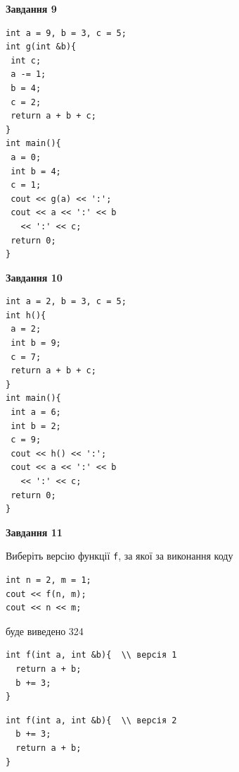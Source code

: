 \documentclass[12pt, ukrainian]{article}
\def\code#1{\Verb!#1!}
\begin{document}
{\begin {large}
\begin{minipage}[t]{11.0cm}
\end{minipage}


\begin{minipage}[t]{7.0cm}

\begin{center}
\textbf{Завдання 9}
\end{center}
\vspace{-8mm}

\begin{verbatim}
int a = 9, b = 3, c = 5;
int g(int &b){
 int c;
 a -= 1;
 b = 4;
 c = 2;
 return a + b + c;
}
int main(){
 a = 0;
 int b = 4;
 c = 1;
 cout << g(a) << ':';
 cout << a << ':' << b 
   << ':' << c;
 return 0;
}
\end{verbatim}



\begin{center}
\textbf{Завдання 10}
\end{center}
\vspace{-8mm}

\begin{verbatim}
int a = 2, b = 3, c = 5;
int h(){
 a = 2;
 int b = 9;
 c = 7;
 return a + b + c;
}
int main(){
 int a = 6;
 int b = 2;
 c = 9;
 cout << h() << ':';
 cout << a << ':' << b 
   << ':' << c;
 return 0;
}
\end{verbatim}

\end{minipage}
\vline \hspace{1mm}
\begin{minipage}[t]{11.0cm}

\begin{center}
\textbf{Завдання 11}
\end{center}
Виберіть версію функції \code{f}, за якої за виконання коду
\begin{verbatim}
int n = 2, m = 1;
cout << f(n, m);
cout << n << m;
\end{verbatim}

буде виведено 324

\begin{verbatim}
int f(int a, int &b){  \\ версія 1
  return a + b;
  b += 3;
}
\end{verbatim}

\vspace{-8mm}\begin{verbatim}
int f(int a, int &b){  \\ версія 2
  b += 3;
  return a + b;
}
\end{verbatim}


\end{minipage}
\end{large}}
\end{document}
